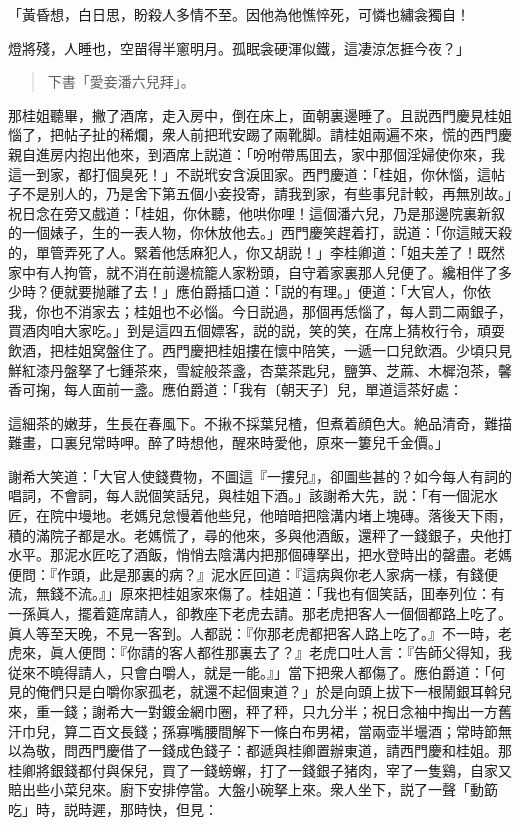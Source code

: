 \begin{myquote}
「黃昏想，白日思，盼殺人多情不至。因他為他憔悴死，可憐也繡衾獨自！

燈將殘，人睡也，空㽞得半窻明月。孤眠衾硬渾似鐵，這凄涼怎捱今夜？」
\end{myquote}

\begin{quotation}
\begin{flushright}
下書「愛妾潘六兒拜」。
\end{flushright}
\end{quotation}

那桂姐聽畢，撇了酒席，走入房中，倒在床上，面朝裏邊睡了。且説西門慶見桂姐惱了，把帖子扯的稀爛，衆人前把玳安踢了兩靴脚。請桂姐兩遍不來，慌的西門慶親自進房内抱出他來，到酒席上説道：「吩咐帶馬囬去，家中那個淫婦使你來，我這一到家，都打個臭死！」不説玳安含淚囬家。西門慶道：「桂姐，你休惱，這帖子不是别人的，乃是舍下第五個小妾投寄，請我到家，有些事兒計較，再無別故。」祝日念在旁又戲道：「桂姐，你休聽，他哄你哩！這個潘六兒，乃是那邊院裏新叙的一個婊子，生的一表人物，你休放他去。」西門慶笑趕着打，説道：「你這賊天殺的，單管弄死了人。緊着他恁麻犯人，你又胡説！」李桂卿道：「姐夫差了！既然家中有人拘管，就不消在前邊梳籠人家粉頭，自守着家裏那人兒便了。纔相伴了多少時？便就要抛離了去！」應伯爵插口道：「説的有理。」便道：「大官人，你依我，你也不消家去；桂姐也不必惱。今日説過，那個再恁惱了，每人罰二兩銀子，買酒肉咱大家吃。」到是這四五個嫖客，説的説，笑的笑，在席上猜枚行令，頑耍飲酒，把桂姐窝盤住了。西門慶把桂姐摟在懷中陪笑，一遞一口兒飲酒。少頃只見鮮紅漆丹盤拏了七鍾茶來，雪綻般茶盞，杏葉茶匙兒，鹽笋、芝蔴、木樨泡茶，馨香可掬，每人面前一盞。應伯爵道：「我有〔朝天子〕兒，單道這茶好處：

\begin{myquote}
這細茶的嫩芽，生長在春風下。不揪不採葉兒楂，但煮着顔色大。絶品清奇，難描難畫，口裏兒常時呷。醉了時想他，醒來時愛他，原來一簍兒千金價。」
\end{myquote}

謝希大笑道：「大官人使錢費物，不圖這『一摟兒』，卻圖些甚的？如今每人有詞的唱詞，不會詞，每人説個笑話兒，與桂姐下酒。」該謝希大先，説：「有一個泥水匠，在院中墁地。老媽兒怠慢着他些兒，他暗暗把陰溝内堵上塊磚。落後天下雨，積的滿院子都是水。老媽慌了，尋的他來，多與他酒飯，還秤了一錢銀子，央他打水平。那泥水匠吃了酒飯，悄悄去陰溝内把那個磚拏出，把水登時出的罄盡。老媽便問：『作頭，此是那裏的病？』泥水匠回道：『這病與你老人家病一樣，有錢便流，無錢不流。』」原來把桂姐家來傷了。桂姐道：「我也有個笑話，囬奉列位：有一孫眞人，擺着筵席請人，卻教座下老虎去請。那老虎把客人一個個都路上吃了。眞人等至天晚，不見一客到。人都説：『你那老虎都把客人路上吃了。』不一時，老虎來，眞人便問：『你請的客人都徃那裏去了？』老虎口吐人言：『告師父得知，我従來不曉得請人，只會白嚼人，就是一能。』」當下把衆人都傷了。應伯爵道：「何見的俺們只是白嚼你家孤老，就還不起個東道？」於是向頭上拔下一根鬧銀耳斡兒來，重一錢；謝希大一對鍍金網巾圈，秤了秤，只九分半；祝日念袖中掏出一方舊汗巾兒，算二百文長錢；孫寡嘴腰間解下一條白布男裙，當兩壶半壜酒；常時節無以為敬，問西門慶借了一錢成色錢子：都遞與桂卿置辦東道，請西門慶和桂姐。那桂卿將銀錢都付與保兒，買了一錢螃蠏，打了一錢銀子猪肉，宰了一隻鷄，自家又賠出些小菜兒來。廚下安排停當。大盤小碗拏上來。衆人坐下，説了一聲「動筯吃」時，説時遲，那時快，但見：

